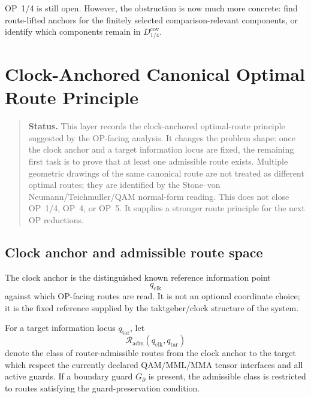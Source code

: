 \begin{remark}
\label{rem:v410r09-op14-status-after-r09}
OP~1/4 is still open. However, the obstruction is now much more concrete:
find route-lifted anchors for the finitely selected comparison-relevant
components, or identify which components remain in
\(D_{1/4}^{\mathrm{cov}}\).
\end{remark}



\clearpage
\section{Clock-Anchored Canonical Optimal Route Principle}
\label{sec:v410r10-clock-anchored-canonical-optimal-route}

\begin{quote}\small
\noindent\textbf{Status.}
This layer records the clock-anchored optimal-route principle suggested by the
OP-facing analysis. It changes the problem shape: once the clock anchor and a
target information locus are fixed, the remaining first task is to prove that at
least one admissible route exists. Multiple geometric drawings of the same
canonical route are not treated as different optimal routes; they are identified
by the Stone--von Neumann/Teichmuller/QAM normal-form reading. This does not
close OP~1/4, OP~4, or OP~5. It supplies a stronger route principle for the
next OP reductions.
\end{quote}

\subsection{Clock anchor and admissible route space}
\label{subsec:v410r10-clock-anchor-admissible-route-space}

\begin{definition}
\label{def:v410r10-clock-anchor}
The clock anchor is the distinguished known reference information point
\[
 q_{\mathrm{clk}}
\]
against which OP-facing routes are read. It is not an optional coordinate
choice; it is the fixed reference supplied by the taktgeber/clock structure of
the system.
\end{definition}

\begin{definition}
\label{def:v410r10-admissible-clock-to-target-routes}
For a target information locus \(q_{\mathrm{tar}}\), let
\[
 \mathcal R_{\mathrm{adm}}(q_{\mathrm{clk}},q_{\mathrm{tar}})
\]
denote the class of router-admissible routes from the clock anchor to the target
which respect the currently declared QAM/MML/MMA tensor interfaces and all
active guards. If a boundary guard \(G_{\partial}\) is present, the admissible
class is restricted to routes satisfying the guard-preservation condition.
\end{definition}

